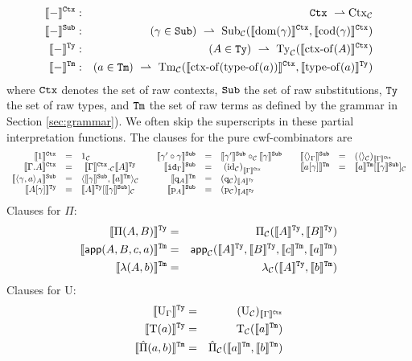 \documentclass{lmcs}
\def\UU{\mathrm{U}}
\def\Ta{\mathrm{T}}
\newcommand{\intCtxU}[1]{\llbracket #1 \rrbracket^\RawCtx}
\newcommand{\intSubU}[1]{\llbracket #1 \rrbracket^\RawSub}
\newcommand{\intTyU}[1]{\llbracket #1 \rrbracket^\RawTy}
\newcommand{\intTmU}[1]{\llbracket #1 \rrbracket^\RawTm}
\begin{document}
\begin{eqnarray*}
\intCtxU{-} &:& \RawCtx\ \rightharpoonup \Ctx_\C\\
\intSubU{-}&:& (\gamma \in \RawSub)\ \rightharpoonup \
\Sub_\C(\intCtxU{\domain(\gamma)}, \intCtxU{\codomain(\gamma)})\\
\intTyU{-}&:& (A \in \RawTy)\ \rightharpoonup\ \Ty_\C(\intCtxU{\ctxof(A)})\\
\intTmU{-}&:& (a \in\RawTm)\ \rightharpoonup\
\Tm_\C (\intCtxU{\ctxof(\typeof(a))}, \intTyU{\typeof(a)})
\end{eqnarray*}
where ${\tt Ctx}$ denotes the set of raw contexts, ${\tt Sub}$ the set of raw substitutions, ${\tt Ty}$ the set of raw types, and ${\tt Tm}$ the set of raw terms as defined by the grammar in Section \ref{sec:grammar}). 
We often skip the superscripts in these partial interpretation functions. The clauses for the pure cwf-combinators are
\[
\begin{array}{rclcrclcrcl}
\intCtxU{1} &=& 1_\C 						&&
\intSubU{\gamma' \circ \gamma} &= & \intSubU{\gamma'} \circ_\C \intSubU{\gamma}&&
\intSubU{ \langle  \rangle_ \Gamma  } &=&  (\langle  \rangle_\C) _{ \intCtxU \Gamma  }
\\
\intCtxU{ \Gamma .A} &=& \ \intCtxU \Gamma ._\C \intTyU{A}	&&
\intSubU{\id_{\Gamma}} & = &\ {(\idC)}_{\intCtxU{\Gamma}}	&&
\intTmU{a[\gamma]} &=& \intTmU a[\intSubU \gamma]_\C
\\
\intSubU{ \langle  \gamma , a \rangle_A } &=& \langle \intSubU \gamma , \intTmU a \rangle_\C&&
\intTmU {\qI_A} &= & (\qI_\C)_{\intTyU A}
\\
\intTyU{A[\gamma]} &=& \intTyU A [\intSubU \gamma]_\C		&&
\intSubU {\p_A} &= & (\p_\C)_{\intTyU A} 
\end{array}
\]
Clauses for $\Pi$:
\begin{eqnarray*}
\intTyU{\Pi(A,B)} &=& \Pi_\C(\intTyU{A},\intTyU{B})\\
\intTmU{\app(A,B,c,a)} &=& \app_\C(\intTyU{A},\intTyU{B},\intTmU{c},\intTmU{a})\\
\intTmU{\lambda(A,b)} &=& \lambda_\C(\intTyU{A},\intTmU{b})
\end{eqnarray*}
Clauses for $\UU$:
\begin{eqnarray*}
\intTyU{\UU_\Gamma} &=& (\UU_\C)_{\intCtxU{\Gamma}}\\
\intTyU{\Ta(a)} &=& \Ta_\C(\intTmU{a})\\
\intTmU{\hat{\Pi}(a,b)}&=& \hat{\Pi}_\C(\intTmU{a},\intTmU{b})
\end{eqnarray*}
\end{document}
